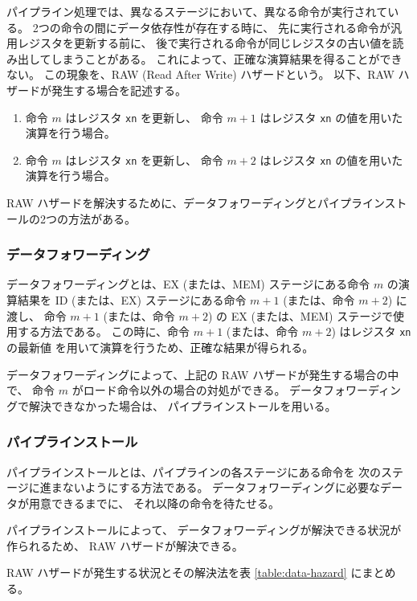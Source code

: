 \documentclass[../specifications]{subfiles}
\begin{document}
  パイプライン処理では、異なるステージにおいて、異なる命令が実行されている。
  2つの命令の間にデータ依存性が存在する時に、
  先に実行される命令が汎用レジスタを更新する前に、
  後で実行される命令が同じレジスタの古い値を読み出してしまうことがある。
  これによって、正確な演算結果を得ることができない。
  この現象を、RAW (Read After Write) ハザードという。
  以下、RAW ハザードが発生する場合を記述する。

  \begin{enumerate}
    \item 命令 $m$ はレジスタ \verb|xn| を更新し、
    命令 $m+1$ はレジスタ \verb|xn| の値を用いた演算を行う場合。

    \item 命令 $m$ はレジスタ \verb|xn| を更新し、
    命令 $m+2$ はレジスタ \verb|xn| の値を用いた演算を行う場合。
  \end{enumerate}

  RAW ハザードを解決するために、データフォワーディングとパイプラインストールの2つの方法がある。

  \subsubsection{データフォワーディング}
  データフォワーディングとは、EX (または、MEM) ステージにある命令 $m$ の演算結果を
  ID (または、EX) ステージにある命令 $m+1$ (または、命令 $m+2$) に渡し、
  命令 $m+1$ (または、命令 $m+2$) の EX (または、MEM) ステージで使用する方法である。
  この時に、命令 $m+1$ (または、命令 $m+2$) はレジスタ \verb|xn| の最新値
  を用いて演算を行うため、正確な結果が得られる。

  データフォワーディングによって、上記の RAW ハザードが発生する場合の中で、
  命令 $m$ がロード命令以外の場合の対処ができる。
  データフォワーディングで解決できなかった場合は、
  パイプラインストールを用いる。

  \subsubsection{パイプラインストール}
  パイプラインストールとは、パイプラインの各ステージにある命令を
  次のステージに進まないようにする方法である。
  データフォワーディングに必要なデータが用意できるまでに、
  それ以降の命令を待たせる。
  
  パイプラインストールによって、
  データフォワーディングが解決できる状況が作られるため、
  RAW ハザードが解決できる。

  RAW ハザードが発生する状況とその解決法を表 \ref{table:data-hazard} にまとめる。
\end{document}
